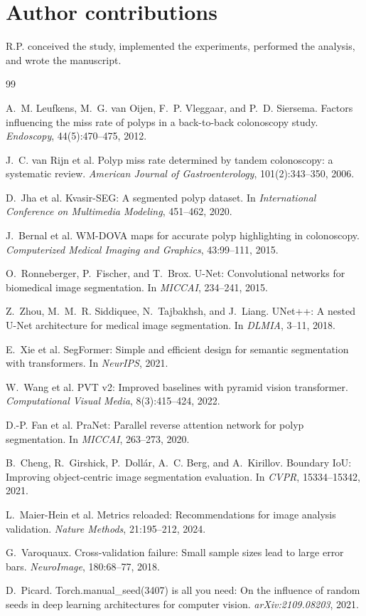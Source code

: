 \documentclass[journal]{IEEEtran}
\begin{document}
\section*{Author contributions}

R.P. conceived the study, implemented the experiments, performed the
analysis, and wrote the manuscript.

\begin{thebibliography}{99}

A.~M. Leufkens, M.~G. van Oijen, F.~P. Vleggaar, and P.~D. Siersema.
Factors influencing the miss rate of polyps in a back-to-back colonoscopy
study. \emph{Endoscopy}, 44(5):470--475, 2012.

J.~C. van Rijn et al.
Polyp miss rate determined by tandem colonoscopy: a systematic review.
\emph{American Journal of Gastroenterology}, 101(2):343--350, 2006.

D.~Jha et al.
Kvasir-SEG: A segmented polyp dataset.
In \emph{International Conference on Multimedia Modeling}, 451--462, 2020.

J.~Bernal et al.
WM-DOVA maps for accurate polyp highlighting in colonoscopy.
\emph{Computerized Medical Imaging and Graphics}, 43:99--111, 2015.

O.~Ronneberger, P.~Fischer, and T.~Brox.
U-Net: Convolutional networks for biomedical image segmentation.
In \emph{MICCAI}, 234--241, 2015.

Z.~Zhou, M.~M.~R. Siddiquee, N.~Tajbakhsh, and J.~Liang.
UNet++: A nested U-Net architecture for medical image segmentation.
In \emph{DLMIA}, 3--11, 2018.

E.~Xie et al.
SegFormer: Simple and efficient design for semantic segmentation with
transformers. In \emph{NeurIPS}, 2021.

W.~Wang et al.
PVT v2: Improved baselines with pyramid vision transformer.
\emph{Computational Visual Media}, 8(3):415--424, 2022.

D.-P. Fan et al.
PraNet: Parallel reverse attention network for polyp segmentation.
In \emph{MICCAI}, 263--273, 2020.

B.~Cheng, R.~Girshick, P.~Doll\'ar, A.~C. Berg, and A.~Kirillov.
Boundary IoU: Improving object-centric image segmentation evaluation.
In \emph{CVPR}, 15334--15342, 2021.

L.~Maier-Hein et al.
Metrics reloaded: Recommendations for image analysis validation.
\emph{Nature Methods}, 21:195--212, 2024.

G.~Varoquaux.
Cross-validation failure: Small sample sizes lead to large error bars.
\emph{NeuroImage}, 180:68--77, 2018.

D.~Picard.
Torch.manual\_seed(3407) is all you need: On the influence of random seeds in
deep learning architectures for computer vision.
\emph{arXiv:2109.08203}, 2021.

\end{thebibliography}
\end{document}
